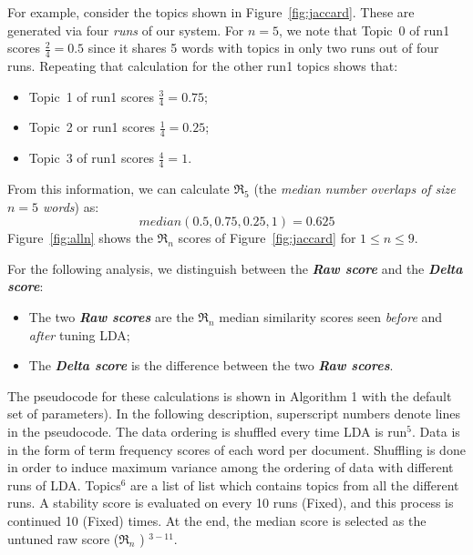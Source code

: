 \documentclass[10pt,conference]{IEEEtran}
\newcommand{\bi}{\begin{itemize}}
\newcommand{\ei}{\end{itemize}}
\theoremstyle{break}
\begin{document}
For example, consider the topics shown in Figure~\ref{fig:jaccard}. These are generated via four {\em runs} of our system.
For $n=5$, we note that Topic~0 of run1 scores $\frac{2}{4}=0.5$ since it shares 5 words with topics in only two runs out of four runs.
Repeating that calculation for the other run1 topics shows that:
\bi
\item Topic~1 of run1 scores $\frac{3}{4}=0.75$;
\item Topic~2 or run1 scores $\frac{1}{4}=0.25$;
\item Topic~3 of run1 scores $\frac{4}{4}=1$.
  \ei
  From this information, we can calculate
  $\Re_5$  (the
  {\em median number overlaps of size $n=5$ words}) as:
  \[
   \mathit{median}(0.5, 0.75, 0.25, 1) =0.625\]
  Figure~\ref{fig:alln}
  shows the $\Re_n$ scores of 
  Figure~\ref{fig:jaccard} for $1 \le n \le 9$. 
  
 For the following analysis,
we distinguish between the \textbf{\textit{Raw  score}} and the \textbf{\textit{Delta  score}}:
 \bi
\item The two \textbf{\textit{Raw  scores}} are the $\Re_n$ median similarity scores seen {\em before} and {\em after} tuning LDA;
\item The \textbf{\textit{Delta score}} is the difference between the two
  \textbf{\textit{Raw scores}}.  \ei 
  The pseudocode for these calculations
  is shown in Algorithm 1 with the default set of parameters). In the following
  description, superscript numbers denote lines in the pseudocode. The data ordering is
  shuffled every time LDA is run$^{5}$. Data is in the form of term frequency
  scores of each word per document. Shuffling is done in order to induce maximum
  variance among the ordering of data with  different runs of LDA. Topics$^{6}$ are a list of list which
  contains topics from all the different runs. A stability score is evaluated on
  every 10 runs (Fixed), and this process is continued 10 (Fixed) times. At the end, the median
  score is selected as the untuned raw score ($\Re_n$ ) $^{3-11}$.
\end{document}
